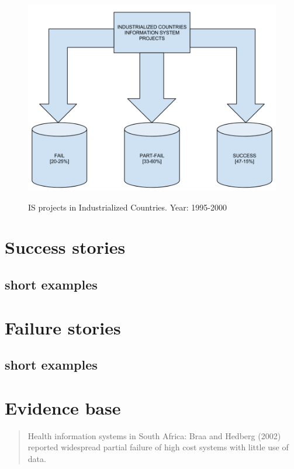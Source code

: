 \begin{figure}
\centering
\includegraphics[width=\columnwidth]{literature/ict_in_dev/images/iCountryISProjects(1995-2000).png}
\label{icisp}
\caption{IS projects in Industrialized Countries. Year: 1995-2000 \cite{rh:isdc}}
\end{figure}


\section{Success stories}
\subsection{short examples}
\section{Failure stories}
\subsection{short examples}

\section{Evidence base}

\begin{quotation}
Health information systems in South Africa: Braa
and Hedberg (2002) reported widespread partial
failure of high cost systems with little use of data.\cite{rh:isdc}
\end{quotation}


